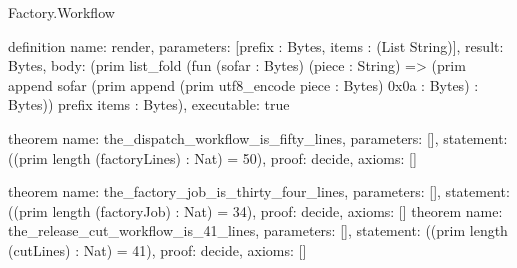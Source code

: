 \begin{lexlean}{Factory.Workflow}
\begin{semanticmodule}
definition{
  name: render,
  parameters: [prefix : Bytes, items : (List String)],
  result: Bytes,
  body: (prim list_fold (fun (sofar : Bytes) (piece : String) => (prim append sofar (prim append (prim utf8_encode piece : Bytes) 0x0a : Bytes) : Bytes)) prefix items : Bytes),
  executable: true
}

theorem{
  name: the_dispatch_workflow_is_fifty_lines,
  parameters: [],
  statement: ((prim length (factoryLines) : Nat) = 50),
  proof: decide{},
  axioms: []
}

theorem{
  name: the_factory_job_is_thirty_four_lines,
  parameters: [],
  statement: ((prim length (factoryJob) : Nat) = 34),
  proof: decide{},
  axioms: []
}
theorem{
  name: the_release_cut_workflow_is_41_lines,
  parameters: [],
  statement: ((prim length (cutLines) : Nat) = 41),
  proof: decide{},
  axioms: []
}
\end{semanticmodule}
\end{lexlean}
